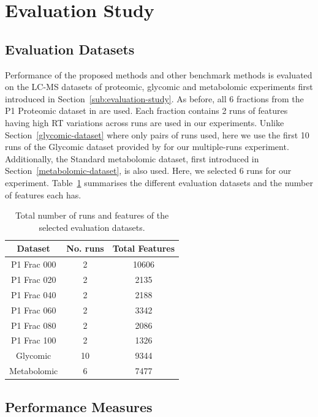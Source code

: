 \section{Evaluation Study}

\subsection{Evaluation Datasets}
\label{sub:Evaluation-datasets}

Performance of the proposed methods and other benchmark methods is evaluated on the LC-MS datasets of proteomic, glycomic and metabolomic experiments first introduced in Section~\ref{sub:evaluation-study}. As before, all 6 fractions from the P1 Proteomic dataset in \cite{Lange2008} are used. Each fraction contains 2 runs of features having high \ac{RT} variations across runs are used in our experiments. Unlike Section~\ref{glycomic-dataset} where only pairs of runs used, here we use the first 10 runs of the Glycomic dataset provided by \cite{Tsai2013a} for our multiple-runs experiment. Additionally, the Standard metabolomic dataset, first introduced in Section~\ref{metabolomic-dataset}, is also used. Here, we selected 6 runs for our experiment.  Table~\ref{tab:hdp-datasets} summarises the different evaluation datasets and the number of features each has.

\begin{table}[!htbp]
\begin{centering}
\begin{tabular}{|c|c|c|}
\hline 
Dataset & No. runs & Total Features\tabularnewline
\hline 
\hline 
P1 Frac 000 & 2 & 10606\tabularnewline
\hline 
P1 Frac 020 & 2 & 2135\tabularnewline
\hline 
P1 Frac 040 & 2 & 2188\tabularnewline
\hline 
P1 Frac 060 & 2 & 3342\tabularnewline
\hline 
P1 Frac 080 & 2 & 2086\tabularnewline
\hline 
P1 Frac 100 & 2 & 1326\tabularnewline
\hline 
Glycomic & 10 & 9344\tabularnewline
\hline 
Metabolomic & 6 & 7477\tabularnewline
\hline 
\end{tabular}
\par\end{centering}

\caption{Total number of runs and features of the selected evaluation datasets. \label{tab:hdp-datasets}}
\end{table}

\subsection{Performance Measures}
\label{sub:Performance-Measures}

